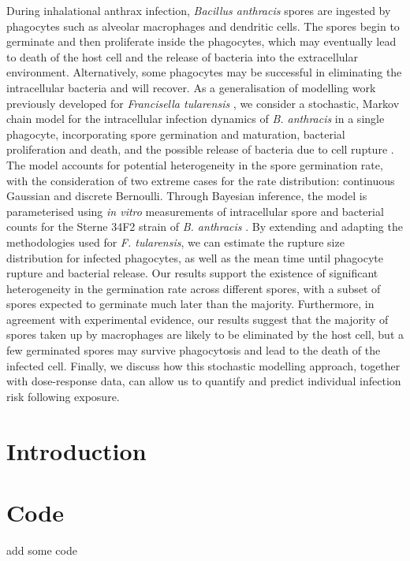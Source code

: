 \documentclass[11pt,a4paper]{article}
\begin{document}
During inhalational anthrax infection, \textit{Bacillus anthracis} spores are ingested by phagocytes such as alveolar macrophages and dendritic cells. The spores begin to germinate and then proliferate inside the phagocytes, which may eventually lead to death of the host cell and the release of bacteria into the extracellular environment. Alternatively, some phagocytes may be successful in eliminating the intracellular bacteria and will recover. As a generalisation of modelling work previously developed for \textit{Francisella tularensis} \cite{carruthers}, we consider a stochastic, Markov chain model for the intracellular infection dynamics of \textit{B. anthracis} in a single phagocyte, incorporating spore germination and maturation, bacterial proliferation and death, and the possible release of bacteria due to cell rupture \cite{williams}. The model accounts for potential heterogeneity in the spore germination rate, with the consideration of two extreme cases for the rate distribution: continuous Gaussian and discrete Bernoulli. Through Bayesian inference, the model is parameterised using \textit{in vitro} measurements of intracellular spore and bacterial counts for the Sterne 34F2 strain of \textit{B. anthracis} \cite{kang, pantha}. By extending and adapting the methodologies used for \textit{F. tularensis}, we can estimate the rupture size distribution for infected phagocytes, as well as the mean time until phagocyte rupture and bacterial release. Our results support the existence of significant heterogeneity in the germination rate across different spores, with a subset of spores expected to germinate much later than the majority. Furthermore, in agreement with experimental evidence, our results suggest that the majority of spores taken up by macrophages are likely to be eliminated by the host cell, but a few germinated spores may survive phagocytosis and lead to the death of the infected cell. Finally, we discuss how this stochastic modelling approach, together with dose-response data, can allow us to quantify and predict individual infection risk following exposure.

\section{Introduction}

\section{Code}

add some code
 
\end{document}
